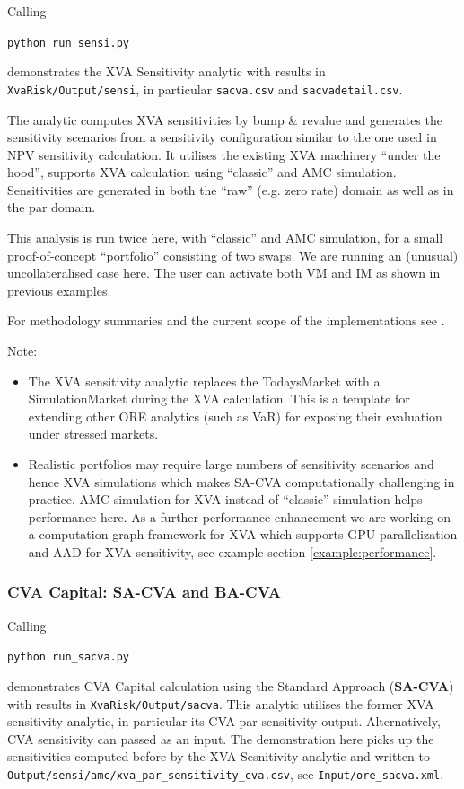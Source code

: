 Calling

\medskip
\centerline {\tt python run\_sensi.py}

\medskip
demonstrates the XVA Sensitivity analytic with results in {\tt XvaRisk/Output/sensi}, in particular
{\tt sacva.csv} and {\tt sacvadetail.csv}.

The analytic computes XVA sensitivities by bump \& revalue and generates the sensitivity scenarios from a
sensitivity configuration similar to the one used in NPV sensitivity calculation. It utilises the existing
XVA machinery ``under the hood'', supports XVA calculation using ``classic'' and AMC simulation.
Sensitivities are generated in both the ``raw'' (e.g. zero rate) domain as well as in the par domain.

This analysis is run twice here, with ``classic'' and AMC simulation, for a small proof-of-concept
``portfolio'' consisting of two swaps. We are running an (unusual) uncollateralised case here. The user
can activate both VM and IM as shown in previous examples.

For methodology summaries and the current scope of the implementations see \cite{methods}.

Note:
\begin{itemize}
\item The XVA sensitivity analytic replaces the TodaysMarket with a SimulationMarket during
  the XVA calculation. This is a template for extending other ORE analytics (such as VaR) for exposing
  their evaluation under stressed markets.
\item Realistic portfolios may require large numbers of sensitivity scenarios and hence XVA simulations
  which makes SA-CVA computationally challenging in practice. AMC simulation for XVA instead of ``classic''
  simulation helps performance here. As a further performance enhancement we are working on a computation
  graph framework for XVA which supports GPU parallelization and AAD for XVA sensitivity, see example
  section \ref{example:performance}.
\end{itemize}

\subsubsection{CVA Capital: SA-CVA and BA-CVA}\label{example:xvarisk_capital}

Calling

\medskip
\centerline {\tt python run\_sacva.py}

\medskip
demonstrates CVA Capital calculation using the Standard Approach ({\bf SA-CVA}) with results in
{\tt XvaRisk/Output/sacva}. This analytic utilises the former XVA sensitivity analytic, in particular
its CVA par sensitivity output. Alternatively, CVA sensitivity can passed as an input. The
demonstration here picks up the sensitivities computed before by the XVA Sesnitivity analytic and
written to {\tt Output/sensi/amc/xva\_par\_sensitivity\_cva.csv}, see {\tt Input/ore\_sacva.xml}.

